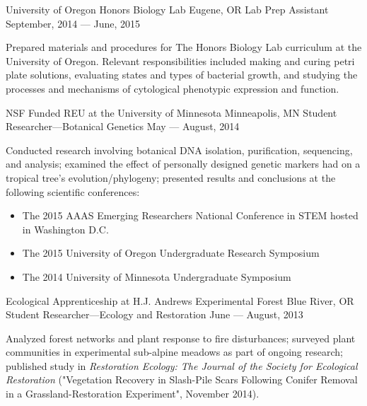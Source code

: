 
\showoff
{University of Oregon Honors Biology Lab}
{Eugene, OR}
{Lab Prep Assistant}
{September, 2014 --- June, 2015}

Prepared materials and procedures for The Honors Biology Lab curriculum at the University of Oregon. Relevant responsibilities included making and curing petri plate solutions, evaluating states and types of bacterial growth, and studying the processes and mechanisms of cytological phenotypic expression and function.

\myBreak

\showoff
{NSF Funded REU at the University of Minnesota}
{Minneapolis, MN}
{Student Researcher---Botanical Genetics}
{May --- August, 2014}
     
Conducted research involving botanical DNA isolation, purification, sequencing, and analysis; examined the effect of personally designed genetic markers had on a tropical tree’s evolution/phylogeny; presented results and conclusions at the following scientific conferences: 
\begin{itemize}[label=$\triangleright$]
\item{The 2015 AAAS Emerging Researchers National Conference in STEM hosted in Washington D.C.}
\item{The 2015 University of Oregon Undergraduate Research Symposium}
\item{The 2014 University of Minnesota Undergraduate Symposium}
\end{itemize}

\myBreak

\showoff
{Ecological Apprenticeship at H.J. Andrews Experimental Forest}
{Blue River, OR}
{Student Researcher---Ecology and Restoration}
{June --- August, 2013}

Analyzed forest networks and plant response to fire disturbances; surveyed plant communities in experimental sub-alpine meadows as part of ongoing research; published study in \textit{Restoration Ecology: The Journal of the Society for Ecological Restoration} ("Vegetation Recovery in Slash-Pile Scars Following Conifer Removal in a Grassland-Restoration Experiment", November 2014).
